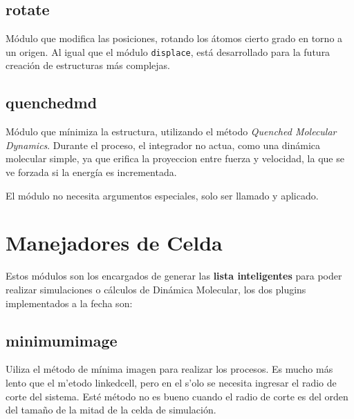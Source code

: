 \subsection{rotate}
M\'odulo que modifica las posiciones, rotando los \'atomos cierto grado en torno a un origen. Al igual que el m\'odulo \verb|displace|, est\'a desarrollado para la futura creaci\'on de estructuras m\'as complejas.


\subsection{quenchedmd}
M\'odulo que m\'inimiza la estructura, utilizando el m\'etodo \textit{Quenched Molecular Dynamics}. Durante el proceso, el integrador no actua, como una din\'amica molecular simple, ya que erifica la proyeccion entre fuerza y velocidad, la que se ve forzada si la energ\'ia es incrementada.

El m\'odulo no necesita argumentos especiales, solo ser llamado y aplicado.

\section{Manejadores de Celda}
Estos m\'odulos son los encargados de generar las \textbf{lista inteligentes} para poder realizar simulaciones o c\'alculos de Din\'amica Molecular, los dos plugins implementados a la fecha son:

\subsection{minimumimage}
Uiliza el m\'etodo de m\'inima imagen para realizar los procesos. Es mucho m\'as lento que el m'etodo linkedcell, pero en el s'olo se necesita ingresar el radio de corte del sistema. Est\'e m\'etodo no es bueno cuando el radio de corte es del orden del tama\~no de la mitad de la celda de simulaci\'on.

